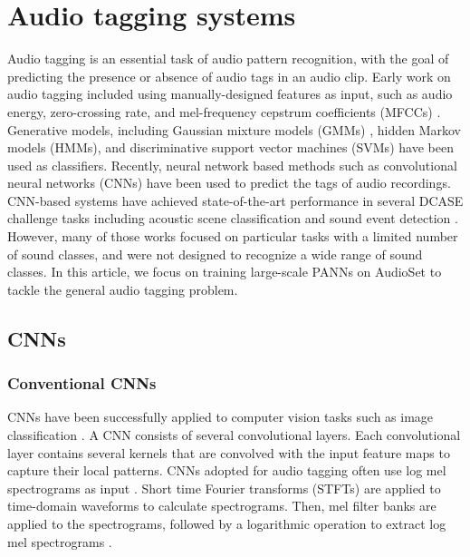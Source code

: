 \documentclass[journal]{IEEEtran}
\begin{document}
\section{Audio tagging systems}\label{section:at_systems}
Audio tagging is an essential task of audio pattern recognition, with the goal of predicting the presence or absence of audio tags in an audio clip. Early work on audio tagging included using manually-designed features as input, such as audio energy, zero-crossing rate, and mel-frequency cepstrum coefficients (MFCCs) \cite{li2001classification}. Generative models, including Gaussian mixture models (GMMs) \cite{vuegen2013mfcc}\cite{mesaros2010acoustic}, hidden Markov models (HMMs), and discriminative support vector machines (SVMs) \cite{uzkent2012non} have been used as classifiers. Recently, neural network based methods such as convolutional neural networks (CNNs) have been used \cite{choi2016automatic} to predict the tags of audio recordings. CNN-based systems have achieved state-of-the-art performance in several DCASE challenge tasks including acoustic scene classification \cite{mesaros2018multi} and sound event detection \cite{cakir2015polyphonic}. However, many of those works focused on particular tasks with a limited number of sound classes, and were not designed to recognize a wide range of sound classes. In this article, we focus on training large-scale PANNs on AudioSet \cite{gemmeke2017audio} to tackle the general audio tagging problem. 



\subsection{CNNs}\label{subsection:cnns}
\subsubsection{Conventional CNNs}
CNNs have been successfully applied to computer vision tasks such as image classification \cite{dai2017very}\cite{he2016deep}. A CNN consists of several convolutional layers. Each convolutional layer contains several kernels that are convolved with the input feature maps to capture their local patterns.  CNNs adopted for audio tagging \cite{choi2016automatic}\cite{kong2019weakly} often use log mel spectrograms as input \cite{choi2016automatic}\cite{kong2019weakly}. Short time Fourier transforms (STFTs) are applied to time-domain waveforms to calculate spectrograms. Then, mel filter banks are applied to the spectrograms, followed by a logarithmic operation to extract log mel spectrograms \cite{choi2016automatic}\cite{kong2019weakly}.
\end{document}
